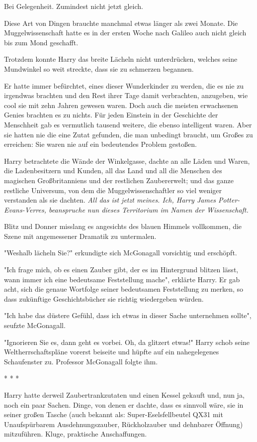 {Bei Gelegenheit. Zumindest nicht jetzt gleich.

Diese Art von Dingen brauchte manchmal etwas länger als zwei Monate. Die Muggelwissenschaft hatte es in der ersten Woche nach Galileo auch nicht gleich bis zum Mond geschafft.

Trotzdem konnte Harry das breite Lächeln nicht unterdrücken, welches seine Mundwinkel so weit streckte, dass sie zu schmerzen begannen.

Er hatte immer befürchtet, eines dieser Wunderkinder zu werden, die es nie zu irgendwas brachten und den Rest ihrer Tage damit verbrachten, anzugeben, wie cool sie mit zehn Jahren gewesen waren. Doch auch die meisten erwachsenen Genies brachten es zu nichts. Für jeden Einstein in der Geschichte der Menschheit gab es vermutlich tausend weitere, die ebenso intelligent waren. Aber sie hatten nie die eine Zutat gefunden, die man unbedingt braucht, um Großes zu erreichen: Sie waren nie auf ein bedeutendes Problem gestoßen.

Harry betrachtete die Wände der Winkelgasse, dachte an alle Läden und Waren, die Ladenbesitzern und Kunden, all das Land und all die Menschen des magischen Großbritanniens und der restlichen Zaubererwelt; und das ganze restliche Universum, von dem die Muggelwissenschaftler so viel weniger verstanden als sie dachten. \emph{All das ist jetzt meines. Ich, Harry James Potter-Evans-Verres, beanspruche nun dieses Territorium im Namen der Wissenschaft.}

Blitz und Donner misslang es angesichts des blauen Himmels vollkommen, die Szene mit angemessener Dramatik zu untermalen.

"Weshalb lächeln Sie?" erkundigte sich McGonagall vorsichtig und erschöpft.

"Ich frage mich, ob es einen Zauber gibt, der es im Hintergrund blitzen lässt, wann immer ich eine bedeutsame Feststellung mache", erklärte Harry. Er gab acht, sich die genaue Wortfolge seiner bedeutsamen Feststellung zu merken, so dass zukünftige Geschichtsbücher sie richtig wiedergeben würden.

"Ich habe das düstere Gefühl, dass ich etwas in dieser Sache unternehmen sollte", seufzte McGonagall.

"Ignorieren Sie es, dann geht es vorbei. Oh, da glitzert etwas!" Harry schob seine Weltherrschaftspläne vorerst beiseite und hüpfte auf ein nahegelegenes Schaufenster zu. Professor McGonagall folgte ihm.

* * *

Harry hatte derweil Zaubertrankzutaten und einen Kessel gekauft und, nun ja, noch ein paar Sachen. Dinge, von denen er dachte, dass es sinnvoll wäre, sie in seiner großen Tasche (auch bekannt als: Super-Eselsfellbeutel QX31 mit Unaufspürbarem Ausdehnungszauber, Rückholzauber und dehnbarer Öffnung) mitzuführen. Kluge, praktische Anschaffungen.

}
